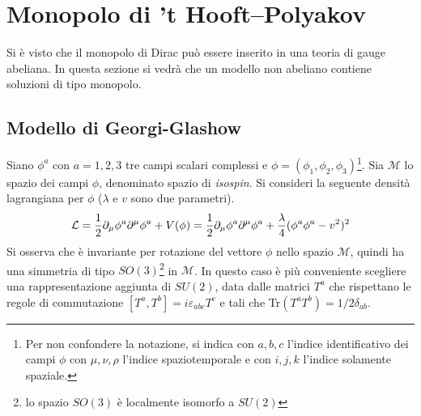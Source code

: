 \section{Monopolo di ’t Hooft–Polyakov}
Si è visto che il monopolo di Dirac può essere inserito in una teoria di gauge abeliana.
In questa sezione si vedrà che un modello non abeliano contiene soluzioni di tipo monopolo.
\subsection{Modello di Georgi-Glashow}
Siano $\phi^a$ con $a=1,2,3$ tre campi scalari complessi e $\phi =
(\phi _1, \phi _2,\phi _3)$\footnote{
   Per non confondere la notazione, si indica con $a,b,c$ l'indice identificativo
   dei campi $\phi$ con $\mu,\nu,\rho$ l'indice spaziotemporale e con $i,j,k$
   l'indice solamente spaziale.
}.
Sia $\mathcal{M}$ lo spazio dei campi $\phi$, denominato spazio di \emph{isospin}.
Si consideri la seguente densità lagrangiana per $\phi$ ($\lambda$ e $v$ sono due
parametri).
$$
   \mathcal{L} = \frac{1}{2} \partial _\mu \phi ^a \partial ^\mu \phi^a
                + V(\phi)
               = \frac{1}{2} \partial _\mu \phi ^a \partial ^\mu \phi^a
                + \frac{\lambda}{4}( \phi^a \phi^a - v^2 )^2
$$
Si osserva che è invariante per rotazione del vettore $\phi$ nello spazio $\mathcal{M}$,
quindi ha una simmetria di tipo $SO(3)$\footnote{
  lo spazio $SO(3)$ è localmente isomorfo a $SU(2)$
} in $\mathcal{M}$.
In questo caso è più conveniente scegliere una rappresentazione aggiunta di $SU(2)$,
data dalle matrici ${T^a}$ che rispettano le regole di commutazione
$[T^a,T^b] = i \varepsilon_{abc} T^c$ e tali che Tr$(T^aT^b) = 1/2\delta_{ab}$.

